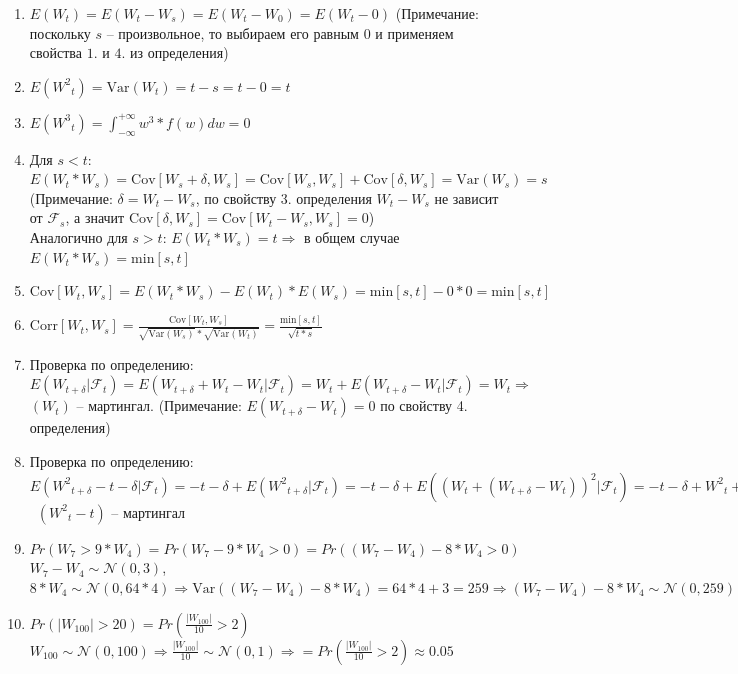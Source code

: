 \documentclass[a4paper]{article}
\begin{document}
\begin{enumerate}
\item $E({W}_t)=E({W}_t-{W}_s)=E({W}_t-{W}_0)=E({W}_t-0)$ (Примечание: поскольку $s$ -- произвольное, то выбираем его равным $0$ и применяем свойства $1.$ и $4.$ из определения)
\item $E({{W}^2}_t)=\text{Var}({W}_t)=t-s=t-0=t$
\item $E({{W}^3}_t)=\int_{-\infty}^{+\infty} w^3 * f(w) dw = 0 $
\item Для $s<t$: $E({W}_t*{W}_s)=\text{Cov}[{W}_s+\delta, {W}_s]=\text{Cov}[{W}_s, {W}_s]+ \text{Cov}[\delta,{W}_s]=\text{Var}({W}_s)=s$ (Примечание: $\delta={W}_t-{W}_s$, по свойству 3. определения ${W}_t-{W}_s$ не зависит от $\mathcal{F}_{s}$, а значит $\text{Cov}[\delta,{W}_s]=\text{Cov}[{W}_t-{W}_s,{W}_s]=0$)
\\ Аналогично для $s>t$: $E({W}_t*{W}_s)=t \Rightarrow$ в общем случае $E({W}_t*{W}_s)=\text{min}[s,t]$
\item $\text{Cov}[{W}_t,{W}_s] =E({W}_t*{W}_s)-E({W}_t)*E({W}_s)=\text{min}[s,t]-0*0=\text{min}[s,t]$
\item $\text{Corr}[{W}_t,{W}_s]=\frac{\text{Cov}[{W}_t,{W}_s]}{ \sqrt{\text{Var}({W}_s)}*\sqrt{\text{Var}({W}_t)}}=\frac{\text{min}[s,t]}{\sqrt{t*s}}$
\item Проверка по определению: $E({W}_{t+\delta}|{\mathcal{F}_{t}})=E({W}_{t+\delta}+{W}_{t}-{W}_{t}|{\mathcal{F}_{t}})={W}_{t}+E({W}_{t+\delta}-{W}_{t}|{\mathcal{F}_{t}})={W}_{t} \Rightarrow$ $({W}_{t})$ -- мартингал. (Примечание: $E({W}_{t+\delta}-{W}_{t})=0$ по свойству 4. определения)
\item  Проверка по определению: $E({W^2}_{t+\delta}-t-\delta|{\mathcal{F}_{t}})=-t-\delta+E({W^2}_{t+\delta}|{\mathcal{F}_{t}})=-t-\delta+E(({W}_{t}+({W}_{t+\delta}-{W}_{t}))^2|{\mathcal{F}_{t}})=-t-\delta+{{W}^2}_t + 2{W}_{t}*E({W}_{t+\delta}-{W}_{t})+E(({W}_{t+\delta}-{W}_{t})^2)=-t-\delta+{{W}^2}_t+\text{Var}({W}_{t+\delta}-{W}_{t})={{W}^2}_t-t \Rightarrow$ \ $({{W}^2}_t-t)$ -- мартингал
\item $Pr({W}_7>9*{W}_4)=Pr({W}_7-9*{W}_4>0)=Pr(({W}_7-{W}_4) - 8*{W}_4>0)$ \\ ${W}_7-{W}_4 \sim \mathcal{N}(0,3)$, $8*{W}_4 \sim \mathcal{N}(0,64*4)\Rightarrow \text{Var}(({W}_7-{W}_4) - 8*{W}_4)=64*4+3=259 \Rightarrow ({W}_7-{W}_4) - 8*{W}_4 \sim \mathcal{N}(0,259) \Rightarrow Pr(({W}_7-{W}_4) - 8*{W}_4>0)=\frac{1}{2} $
\item $Pr(\lvert {W}_{100}\rvert >20)=Pr(\frac{\lvert {W}_{100}\rvert}{10} >2)$
\\ ${W}_{100} \sim \mathcal{N}(0,100) \Rightarrow \frac{\lvert {W}_{100}\rvert}{10} \sim \mathcal{N}(0,1) \Rightarrow =Pr(\frac{\lvert {W}_{100}\rvert}{10} >2)\approx0.05$
\end{enumerate}
\end{document}
